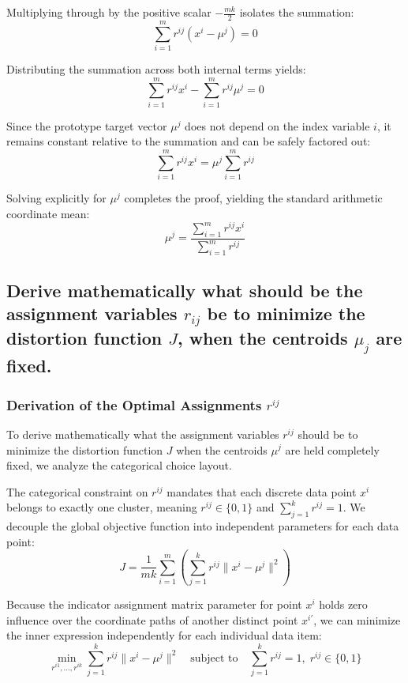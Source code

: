\documentclass[twoside, 10pt]{article}
\begin{document}
Multiplying through by the positive scalar $-\frac{mk}{2}$ isolates the summation:
\begin{equation}
\sum_{i=1}^{m} r^{ij}(x^i - \mu^j) = 0
\end{equation}

Distributing the summation across both internal terms yields:
\begin{equation}
\sum_{i=1}^{m} r^{ij}x^i - \sum_{i=1}^{m} r^{ij}\mu^j = 0
\end{equation}

Since the prototype target vector $\mu^j$ does not depend on the index variable $i$, it remains constant relative to the summation and can be safely factored out:
\begin{equation}
\sum_{i=1}^{m} r^{ij}x^i = \mu^j \sum_{i=1}^{m} r^{ij}
\end{equation}

Solving explicitly for $\mu^j$ completes the proof, yielding the standard arithmetic coordinate mean:
\begin{equation}
\mu^j = \frac{\sum_{i=1}^{m} r^{ij}x^i}{\sum_{i=1}^{m} r^{ij}}
\end{equation}

\subsection{Derive mathematically what should be the assignment variables $r_{ij}$ be to minimize the distortion function $J$, when the centroids $\mu_j$ are fixed.}

\subsubsection{Derivation of the Optimal Assignments $r^{ij}$}
To derive mathematically what the assignment variables $r^{ij}$ should be to minimize the distortion function $J$ when the centroids $\mu^j$ are held completely fixed, we analyze the categorical choice layout.

The categorical constraint on $r^{ij}$ mandates that each discrete data point $x^i$ belongs to exactly one cluster, meaning $r^{ij} \in \{0, 1\}$ and $\sum_{j=1}^k r^{ij} = 1$. We decouple the global objective function into independent parameters for each data point:
\begin{equation}
J = \frac{1}{mk} \sum_{i=1}^{m} \left( \sum_{j=1}^{k} r^{ij} \|x^i - \mu^j\|^2 \right)
\end{equation}

Because the indicator assignment matrix parameter for point $x^i$ holds zero influence over the coordinate paths of another distinct point $x^{i'}$, we can minimize the inner expression independently for each individual data item:
\begin{equation}
\min_{r^{i1}, \dots, r^{ik}} \sum_{j=1}^{k} r^{ij} \|x^i - \mu^j\|^2 \quad \text{subject to} \quad \sum_{j=1}^k r^{ij} = 1, \; r^{ij} \in \{0,1\}
\end{equation}
\end{document}
